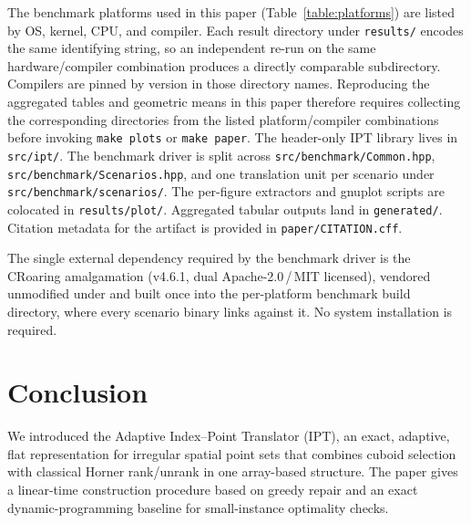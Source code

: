\documentclass[manuscript,screen,review]{acmart}
\theoremstyle{definition}
\theoremstyle{plain}
\begin{document}
The benchmark platforms used in this paper
(Table~\ref{table:platforms}) are listed by OS, kernel, CPU, and
compiler. Each result directory under \texttt{results/} encodes the
same identifying string, so an independent re-run on the same
hardware/compiler combination produces a directly comparable
subdirectory. Compilers are pinned by version in those directory
names. Reproducing the aggregated tables and geometric means in this
paper therefore requires collecting the corresponding
 directories from the listed platform/compiler
combinations before invoking \texttt{make plots} or \texttt{make
paper}. The header-only IPT library lives in
\texttt{src/ipt/}. The benchmark driver is split across
\texttt{src/benchmark/Common.hpp}, \texttt{src/benchmark/Scenarios.hpp}, and
one translation unit per scenario under
\texttt{src/benchmark/scenarios/}. The per-figure extractors and
gnuplot scripts are colocated in \texttt{results/plot/}. Aggregated
tabular outputs
land in \texttt{generated/}. Citation metadata for the artifact is
provided in \texttt{paper/CITATION.cff}.

The single external dependency
required by the benchmark driver is the CRoaring amalgamation
(v4.6.1, dual Apache-2.0\,/\,MIT licensed), vendored unmodified under
 and built once into the per-platform
benchmark build directory, where every scenario binary links against
it. No system installation is required.

\section{Conclusion}
\label{section:conclusion}

We introduced the Adaptive Index--Point Translator (IPT), an exact,
adaptive, flat representation for irregular spatial point sets that
combines cuboid selection with classical Horner rank/unrank in one
array-based structure. The paper gives a linear-time construction
procedure based on greedy repair and an exact dynamic-programming
baseline for small-instance optimality checks.
\end{document}

